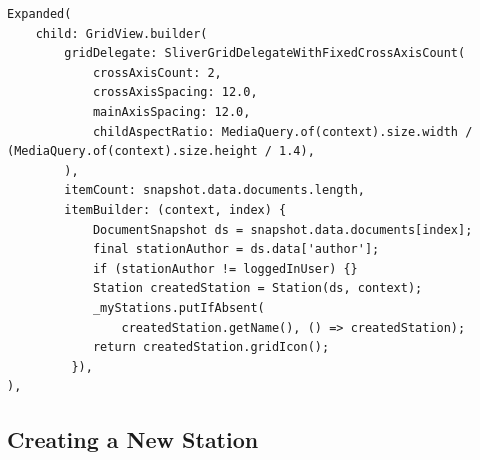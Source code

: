\begin{minipage}[c]{0.95\textwidth}
\begin{center}
\begin{spacing}{0.5}
\begin{lstlisting}[frame=lines,style=XML,caption={Fecthing and displaying the stations of a given user},label=mpd]
Expanded(
	child: GridView.builder(
		gridDelegate: SliverGridDelegateWithFixedCrossAxisCount(
			crossAxisCount: 2,
			crossAxisSpacing: 12.0,
			mainAxisSpacing: 12.0,
			childAspectRatio: MediaQuery.of(context).size.width / (MediaQuery.of(context).size.height / 1.4),
		),
		itemCount: snapshot.data.documents.length,
		itemBuilder: (context, index) {
			DocumentSnapshot ds = snapshot.data.documents[index];
			final stationAuthor = ds.data['author'];
			if (stationAuthor != loggedInUser) {}
			Station createdStation = Station(ds, context);
			_myStations.putIfAbsent(
				createdStation.getName(), () => createdStation);
            return createdStation.gridIcon();
         }),
),
\end{lstlisting}
\end{spacing}
\end{center}
\end{minipage}


\subsection{Creating a New Station}

